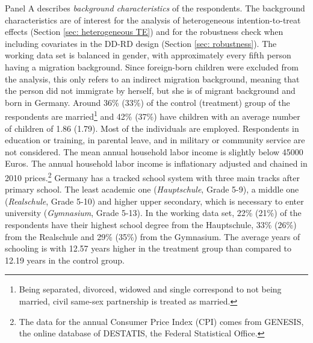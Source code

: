\documentclass[a4paper ]{article}
\begin{document}
Panel A describes \textit{background characteristics} of the respondents. The background characteristics are of interest for the analysis of heterogeneous intention-to-treat effects (Section \ref{sec: heterogeneous TE}) and for the robustness check when including covariates in the DD-RD design (Section \ref{sec: robustness}).\newline
The working data set is balanced in gender, with approximately every fifth person having a migration background. Since foreign-born children were excluded from the analysis, this only refers to an indirect migration background, meaning that the person did not immigrate by herself, but she is of migrant background and born in Germany. Around 36\% (33\%) of the control (treatment) group of the respondents are married\footnote{Being separated, divorced, widowed and single correspond to not being married, civil same-sex partnership is treated as married.} and 42\% (37\%) have children with an average number of children of 1.86 (1.79). Most of the individuals are employed. Respondents in education or training, in parental leave, and in military or community service are not considered. The mean annual household labor income is slightly below 45000 Euros. The annual household labor income is inflationary adjusted and chained in 2010 prices.\footnote{The data for the annual Consumer Price Index (CPI) comes from GENESIS, the online database of DESTATIS, the Federal Statistical Office.} Germany has a tracked school system with three main tracks after primary school. The least academic one (\textit{Hauptschule}, Grade 5-9), a middle one (\textit{Realschule}, Grade 5-10) and higher upper secondary, which is necessary to enter university (\textit{Gymnasium}, Grade 5-13). In the working data set, 22\% (21\%) of the respondents have their highest school degree from the Hauptschule, 33\% (26\%) from the Realschule and 29\% (35\%) from the Gymnasium. The average years of schooling is with 12.57 years higher in the treatment group than compared to 12.19 years in the control group.\newline
\end{document}
